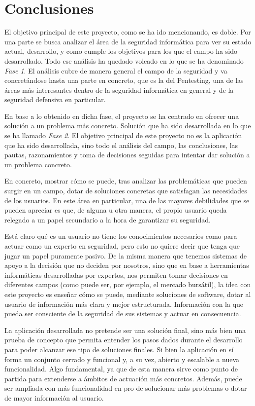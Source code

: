 \chapter{Conclusiones}

El objetivo principal de este proyecto, como se ha ido mencionando, es doble. Por una parte se busca analizar el área de la seguridad informática para ver su estado actual, desarrollo, y como cumple los objetivos para los que el campo ha sido desarrollado. Todo ese análisis ha quedado volcado en lo que se ha denominado \textit{Fase 1}. El análisis cubre de manera general el campo de la seguridad y va concretándose hasta una parte en concreto, que es la del Pentesting, una de las áreas más interesantes dentro de la seguridad informática en general y de la seguridad defensiva en particular.

En base a lo obtenido en dicha fase, el proyecto se ha centrado en ofrecer una solución a un problema más concreto. Solución que ha sido desarrollada en lo que se ha llamado \textit{Fase 2}. El objetivo principal de este proyecto no es la aplicación que ha sido desarrollada, sino todo el análisis del campo, las conclusiones, las pautas, razonamientos y toma de decisiones seguidas para intentar dar solución a un problema concreto.

En concreto, mostrar cómo se puede, tras analizar las problemáticas que pueden surgir en un campo, dotar de soluciones concretas que satisfagan las necesidades de los usuarios. En este área en particular, una de las mayores debilidades que se pueden apreciar es que, de alguna u otra manera, el propio usuario queda relegado a un papel secundario a la hora de garantizar su seguridad.

Está claro qué es un usuario no tiene los conocimientos necesarios como para actuar como un experto en seguridad, pero esto no quiere decir que tenga que jugar un papel puramente pasivo. De la misma manera que tenemos sistemas de apoyo a la decisión que no deciden por nosotros, sino que en base a herramientas informáticas desarrolladas por expertos, nos permiten tomar decisiones en diferentes campos (como puede ser, por ejemplo, el mercado bursátil), la idea con este proyecto es enseñar cómo se puede, mediante soluciones de software, dotar al usuario de información más clara y mejor estructurada. Información con la que pueda ser consciente de la seguridad de sus sistemas y actuar en consecuencia.

La aplicación desarrollada no pretende ser una solución final, sino más bien una prueba de concepto que permita entender los pasos dados durante el desarrollo para poder alcanzar ese tipo de soluciones finales. Si bien la aplicación en sí forma un conjunto cerrado y funcional y, a su vez, abierto y escalable a nueva funcionalidad. Algo fundamental, ya que de esta manera sirve como punto de partida para extenderse a ámbitos de actuación más concretos. Además, puede ser ampliada con más funcionalidad en pro de solucionar más problemas o dotar de mayor información al usuario.

